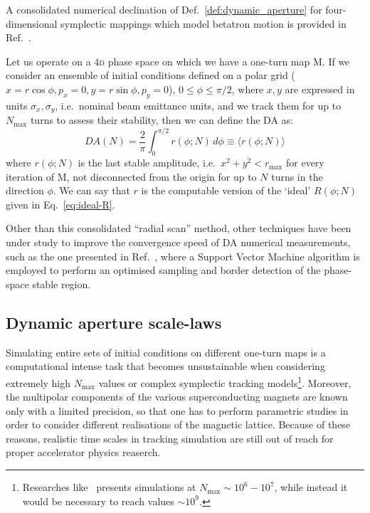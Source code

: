 A consolidated numerical declination of Def.~\ref{def:dynamic_aperture} for four-dimensional symplectic mappings which model betatron motion is provided in Ref.~\cite{PhysRevE.53.4067}.

Let us operate on a 4\textsc{d} phase space on which we have a one-turn map \(\mathrm{M}\). If we consider an ensemble of initial conditions defined on a polar grid (\(x=r\cos\phi, p_x=0, y=r\sin\phi, p_y=0\)), \(0\leq\phi\leq\pi/2\), where \(x,y\) are expressed in units \(\sigma_x, \sigma_y\), i.e.\ nominal beam emittance units, and we track them for up to \(N_{\text{max}}\) turns to assess their stability, then we can define the DA as:
\begin{equation}
	DA(N) = \frac{2}{\pi}\int_0^{\pi/2} r(\phi;N)\,d\phi \equiv \langle r(\phi;N)\rangle
	\label{eq:dynamic_aperture_numerical}
\end{equation}
where \(r(\phi;N)\) is the last stable amplitude, i.e.\ \(x^2 + y^2 < r_{\mathrm{max}}\) for every iteration of \(\mathrm{M}\), not disconnected from the origin for up to \(N\) turns in the direction \(\phi\). We can say that \(r\) is the computable version of the `ideal' \(R(\phi;N)\) given in Eq.~\eqref{eq:ideal-R}.

Other than this consolidated ``radial scan'' method, other techniques have been under study to improve the convergence speed of DA numerical measurements, such as the one presented in Ref.~\cite{vanderveken:ipac2022-mopost047}, where a Support Vector Machine algorithm is employed to perform an optimised sampling and border detection of the phase-space stable region.

\subsection{Dynamic aperture scale-laws}

Simulating entire sets of initial conditions on different one-turn maps is a computational intense task that becomes unsustainable when considering extremely high \(N_{\text{max}}\) values or complex symplectic tracking models\footnote{Researches like~\cite{invlog} presents simulations at \(N_{\text{max}}\sim 10^6-10^7\), while instead it would be necessary to reach values \(\sim 10^9\).}. Moreover, the multipolar components of the various superconducting magnets are known only with a limited precision, so that one has to perform parametric studies in order to consider different realisations of the magnetic lattice. Because of these reasons, realistic time scales in tracking simulation are still out of reach for proper accelerator physics reaserch.

